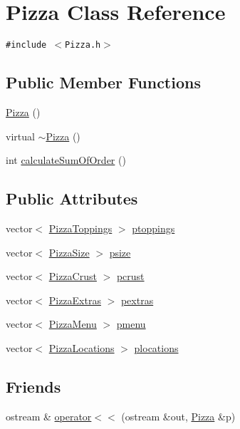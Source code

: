 \hypertarget{class_pizza}{
\section{Pizza Class Reference}
\label{class_pizza}
}
{\tt \#include $<$Pizza.h$>$}

\subsection*{Public Member Functions}
\begin{CompactItemize}
\item 
\hyperlink{class_pizza_700ffe7c4bc34e2c456faa65be04ce6b}{Pizza} ()
\item 
virtual \hyperlink{class_pizza_db2d5b1b2bb633c9f11923d807750a83}{$\sim$Pizza} ()
\item 
int \hyperlink{class_pizza_24b9bb5302a251b41fed3df1fb7ce8ad}{calculate\-Sum\-Of\-Order} ()
\end{CompactItemize}
\subsection*{Public Attributes}
\begin{CompactItemize}
\item 
vector$<$ \hyperlink{class_pizza_toppings}{Pizza\-Toppings} $>$ \hyperlink{class_pizza_00a8ee0e60c8a0813bd0253e2ce99090}{ptoppings}
\item 
vector$<$ \hyperlink{class_pizza_size}{Pizza\-Size} $>$ \hyperlink{class_pizza_e0615fa3029d85be3e626ed0d6e2f6ae}{psize}
\item 
vector$<$ \hyperlink{class_pizza_crust}{Pizza\-Crust} $>$ \hyperlink{class_pizza_996e08e9df9ac8ddc88bd05cd6e02761}{pcrust}
\item 
vector$<$ \hyperlink{class_pizza_extras}{Pizza\-Extras} $>$ \hyperlink{class_pizza_daa120a92c418c69c30c510e3d6fceb4}{pextras}
\item 
vector$<$ \hyperlink{class_pizza_menu}{Pizza\-Menu} $>$ \hyperlink{class_pizza_b86f8b99db37aed0b14a52090e90df73}{pmenu}
\item 
vector$<$ \hyperlink{class_pizza_locations}{Pizza\-Locations} $>$ \hyperlink{class_pizza_4089a0661af312f0d870f8ac9a4bd03c}{plocations}
\end{CompactItemize}
\subsection*{Friends}
\begin{CompactItemize}
\item 
ostream \& \hyperlink{class_pizza_6234ace0cc7b9a861bdeecd0223d6b69}{operator$<$$<$} (ostream \&out, \hyperlink{class_pizza}{Pizza} \&p)
\end{CompactItemize}


